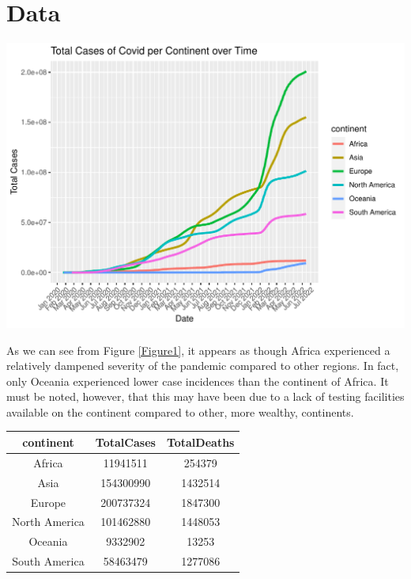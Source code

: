 \documentclass[11pt,preprint, authoryear]{elsarticle}
\let\origfigure\figure
\let\endorigfigure\endfigure
\renewenvironment{figure}[1][2] {
    \expandafter\origfigure\expandafter[H]
} {
    \endorigfigure
}
\let\origtable\table
\let\endorigtable\endtable
\renewenvironment{table}[1][2] {
    \expandafter\origtable\expandafter[H]
} {
    \endorigtable
}
\numberwithin{equation}{section}
\numberwithin{figure}{section}
\numberwithin{table}{section}
\begin{document}
\hypertarget{data}{%
\section{\texorpdfstring{Data \label{Findings}}{Data }}\label{data}}

\begin{figure}[H]

{\centering \includegraphics{q1_files/figure-latex/figure1-1} 

}

\caption{Covid Incidence in Africa compared to Other Regions \label{Figure1}}\label{fig:figure1}
\end{figure}

As we can see from Figure \ref{Figure1}, it appears as though Africa
experienced a relatively dampened severity of the pandemic compared to
other regions. In fact, only Oceania experienced lower case incidences
than the continent of Africa. It must be noted, however, that this may
have been due to a lack of testing facilities available on the continent
compared to other, more wealthy, continents.

\begin{table}

\caption{\label{tab:Figure2}Total Number of Cases and Deaths by Continent}
\centering
\begin{tabular}[t]{c|c|c}
\hline
continent & TotalCases & TotalDeaths\\
\hline
Africa & 11941511 & 254379\\
\hline
Asia & 154300990 & 1432514\\
\hline
Europe & 200737324 & 1847300\\
\hline
North America & 101462880 & 1448053\\
\hline
Oceania & 9332902 & 13253\\
\hline
South America & 58463479 & 1277086\\
\hline
\end{tabular}
\end{table}
\end{document}
